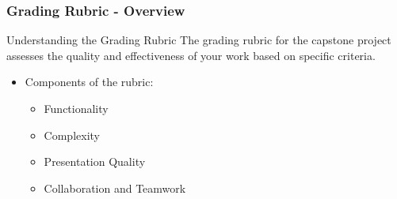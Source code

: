 \documentclass{beamer}
\begin{document}
\begin{frame}[fragile]
    \frametitle{Grading Rubric - Overview}
    \begin{block}{Understanding the Grading Rubric}
        The grading rubric for the capstone project assesses the quality and effectiveness of your work based on specific criteria.
    \end{block}
    \begin{itemize}
        \item Components of the rubric:
            \begin{itemize}
                \item Functionality
                \item Complexity
                \item Presentation Quality
                \item Collaboration and Teamwork
            \end{itemize}
    \end{itemize}
\end{frame}
\end{document}
